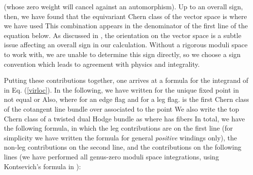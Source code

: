 \documentclass[a4paper,11pt]{article}
\providecommand{\PP}{{\mathbb{P}}}
\begin{document}
(whose zero weight will cancel against an automorphism).
Up to an overall sign, then, we have found
that the equivariant Chern class
of the vector space
\coordHE{} is \coordHE{}
where we have used \coordHE{}
This combination appears in the denominator of the
first line of the equation below.
As discussed in \cite{FOOO}, the orientation
on the vector space \coordHE{}
is a subtle issue affecting an overall sign
in our calculation.  Without a rigorous moduli
space to work with, we are unable to determine this
sign directly, so we choose
a sign convention which leads to agreement with
physics and integrality.

Putting these contributions
together, one arrives at a formula
for the integrand of \coordHE{} in Eq.\!\!\!
(\ref{virloc}).
In the following, we have written \coordHE{} for the
unique fixed point in \myHighlight{$\PP^2$}\coordHE{} not equal \coordHE{}
or \coordHE{}  Also, \coordHE{} where
\coordHE{} for an edge flag and \coordHE{}
for a leg flag.  \coordHE{} is the first Chern class
of the cotangent line bundle over \coordHE{}
associated to the point
\coordHE{}  We also write the top Chern
class of a twisted dual Hodge bundle as
\coordHE{}
where \coordHE{} has fibers \coordHE{}
In total, we have the following formula,
in which the \coordHE{}
leg contributions are on the
first line (for simplicity we have written the
formula for general {\sl positive} windings only),
the non-leg \myHighlight{$H^1(K_{\PP^2})$}\coordHE{} contributions
on the second line, and the \coordHE{}
contributions on the following lines
(we have performed all genus-zero moduli space
integrations, using Kontsevich's formula in \cite{Kont}):
\end{document}
